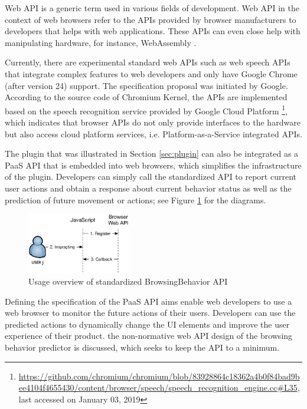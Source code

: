 Web API is a generic term used in various fields of development.
Web API in the context of web browsers refer to the APIs provided
by browser manufacturers to developers that helps with web applications.
These APIs can even close
help with manipulating hardware, for instance, WebAssembly \cite{w3c2018ws}.

Currently, there are experimental standard web APIs such as web speech APIs \cite{mozilla2019speech}
that integrate complex features to web developers and only have 
Google Chrome (after version 24) support. 
The specification proposal was initiated by Google. According to 
the source code of Chromium Kernel, the APIs are implemented based on 
the speech recognition service provided by Google Cloud Platform 
\footnote{\url{https://github.com/chromium/chromium/blob/83928864c18362a4b0f84bad9bee4104f4655430/content/browser/speech/speech\_recognition\_engine.cc\#L35}, last accessed on January 03, 2019},
which indicates that browser APIs do not only provide interfaces to
the hardware but also access cloud platform services, i.e. Platform-as-a-Service integrated 
APIs.

The plugin that was illustrated in Section \ref{sec:plugin} can also be integrated as a PaaS API
that is embedded into web browsers, which simplifies the infrastructure of the plugin. 
Developers can simply call the standardized API to report current user actions and
obtain a response about current behavior status as well as the prediction of future movement or 
actions; see Figure \ref{fig:webapi} for the diagrams.

\begin{figure}[H]
    \centering
    \includegraphics[width=0.4\textwidth]{figures/webapi}
    \caption{Usage overview of standardized BrowsingBehavior API}
    \label{fig:webapi}
\end{figure}

Defining the specification of the PaaS API aims enable web developers to
use a web browser to monitor the future actions of their users.
Developers can use the predicted actions to dynamically change the UI elements
and improve
the user experience of their product. 
the non-normative web API design of the browsing behavior predictor is discussed,
which seeks to keep the API to a minimum. 

